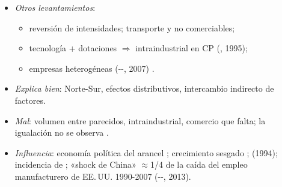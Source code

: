 \documentclass{article}
\begin{document}
\begin{columnas}
\begin{itemize}
\item \emph{Otros levantamientos}:
  \begin{itemize}
  \item reversión de intensidades; transporte y no comerciables;
  \item tecnología + dotaciones $\Rightarrow$ intraindustrial en CP (, 1995);
  \item empresas heterogéneas (--, 2007) .
  \end{itemize}
\item \emph{Explica bien}: Norte-Sur, efectos distributivos, intercambio indirecto de factores.
\item \emph{Mal}: volumen entre parecidos, intraindustrial, comercio que falta; la igualación no se observa .
\item \emph{Influencia}: economía política del arancel  ; crecimiento sesgado ;  (1994); incidencia de  ; «shock de China» $\approx$1/4 de la caída del empleo manufacturero de EE.\,UU. 1990-2007 (--, 2013).
\end{itemize}


\end{columnas}
\end{document}
